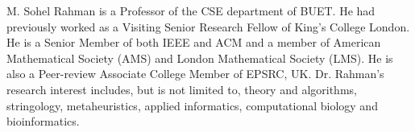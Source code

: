 \documentclass[journal]{IEEEtran}
\begin{document}
\begin{IEEEbiographynophoto}{M. Sohel Rahman} is a Professor of the CSE department of BUET. He had previously worked as a Visiting Senior Research Fellow of King's College London. He is a Senior Member of both IEEE and ACM and a member of American Mathematical Society (AMS) and London Mathematical Society (LMS). He is also a Peer-review Associate College Member of EPSRC, UK. Dr. Rahman's research interest includes, but is not limited to, theory and algorithms, stringology, metaheuristics, applied informatics, computational biology and bioinformatics. 
\end{IEEEbiographynophoto}

\vfill
\end{document}
